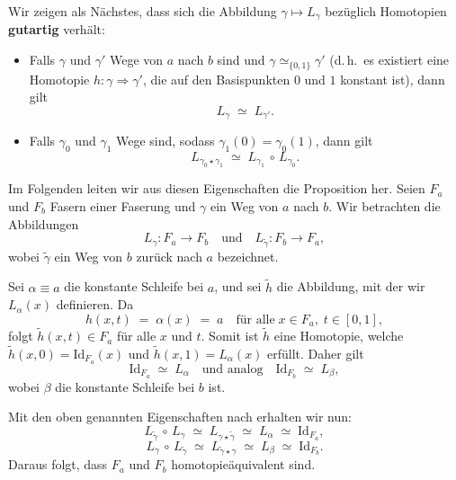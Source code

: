 \documentclass[12pt]{article}
\numberwithin{conj}{section}
\begin{document}
    Wir zeigen als Nächstes, dass sich die Abbildung $\gamma \mapsto L_{\gamma}$ bezüglich
    Homotopien \cite[Prop.~4.61]{hatcher2001} \textbf{gutartig} verhält:
    \begin{itemize}[noitemsep]
        \item Falls $\gamma$ und $\gamma'$ Wege von $a$ nach $b$ sind und $\gamma \simeq
            _{\{0,1\}}\gamma'$ (d.\,h.\ es existiert eine Homotopie
            $h : \gamma \Rightarrow \gamma'$, die auf den Basispunkten $0$ und $1$ konstant
            ist), dann gilt
            \[
                L_{\gamma} \;\simeq\; L_{\gamma'}.
            \]

        \item Falls $\gamma_{0}$ und $\gamma_{1}$ Wege sind, sodass
            $\gamma_{1}(0) = \gamma_{0}(1)$, dann gilt
            \[
                L_{\gamma_0 \star \gamma_1}\;\simeq\; L_{\gamma_1}\,\circ\, L_{\gamma_0}.
            \]
    \end{itemize}
    Im Folgenden leiten wir aus diesen Eigenschaften die Proposition her. Seien
    $F_{a}$ und $F_{b}$ Fasern einer Faserung und $\gamma$ ein Weg von $a$ nach
    $b$. Wir betrachten die Abbildungen
    \[
        L_{\gamma} : F_{a} \longrightarrow F_{b} \quad\text{und}\quad L_{\widetilde{\gamma}}
        : F_{b} \longrightarrow F_{a},
    \]
    wobei $\widetilde{\gamma}$ ein Weg von $b$ zurück nach $a$ bezeichnet.

    \smallskip

    Sei $\alpha \equiv a$ die konstante Schleife bei $a$, und sei $\widetilde{h}$ die
    Abbildung, mit der wir $L_{\alpha}(x)$ definieren. Da
    \[
        h(x,t) \;=\; \alpha(x) \;=\; a \quad\text{für alle}\; x\in F_{a},\; t\in [0,1
        ],
    \]
    folgt $\widetilde{h}(x,t) \in F_{a}$ für alle $x$ und $t$. Somit ist
    $\widetilde{h}$ eine Homotopie, welche $\widetilde{h}(x,0) = \mathrm{Id}_{F_a}(x)$
    und $\widetilde{h}(x,1) = L_{\alpha}(x)$ erfüllt. Daher gilt
    \[
        \mathrm{Id}_{F_a}\;\simeq\; L_{\alpha} \quad\text{und analog}\quad \mathrm{Id}
        _{F_b}\;\simeq\; L_{\beta},
    \]
    wobei $\beta$ die konstante Schleife bei $b$ ist.

    \smallskip

    Mit den oben genannten Eigenschaften nach \cite[Prop.~4.61]{hatcher2001} erhalten
    wir nun:
    \[
        L_{\widetilde{\gamma}}\,\circ\, L_{\gamma} \;\simeq\; L_{\gamma \star
        \widetilde{\gamma}}\;\simeq\; L_{\alpha} \;\simeq\; \mathrm{Id}_{F_a},
    \]
    \[
        L_{\gamma}\,\circ\, L_{\widetilde{\gamma}}\;\simeq\; L_{\widetilde{\gamma} \star
        \gamma}\;\simeq\; L_{\beta} \;\simeq\; \mathrm{Id}_{F_b}.
    \]
    Daraus folgt, dass $F_{a}$ und $F_{b}$ homotopieäquivalent sind.
\end{document}
